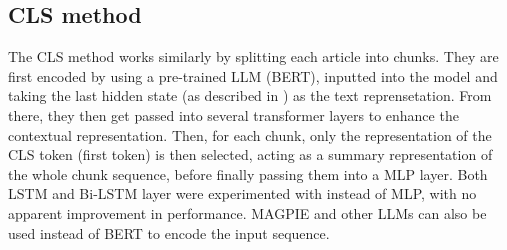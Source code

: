 \subsection{CLS method}

The CLS method works similarly by splitting each article into chunks. They are first encoded by using a pre-trained LLM (BERT), inputted into the model and taking the last hidden state (as described in \cite{sun-2020-finetune}) as the text reprensetation. From there, they then get passed into several transformer layers to enhance the contextual representation. Then, for each chunk, only the representation of the CLS token (first token) is then selected, acting as a summary representation of the whole chunk sequence, before finally passing them into a MLP layer. Both LSTM and Bi-LSTM layer were experimented with instead of MLP, with no apparent improvement in performance. MAGPIE and other LLMs can also be used instead of BERT to encode the input sequence.



